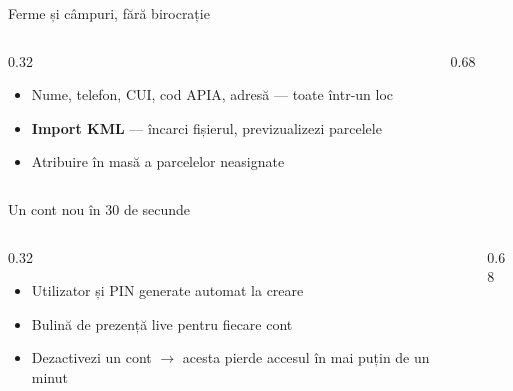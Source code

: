 \documentclass[aspectratio=169,10pt]{beamer}
\begin{document}
\begin{frame}{Ferme și câmpuri, fără birocrație}
  \begin{columns}[T]
    \begin{column}{0.32\linewidth}
      \vspace{0.3cm}
      \begin{itemize}
        \item Nume, telefon, CUI, cod APIA, adresă — toate într-un loc
        \item \textbf{Import KML} — încarci fișierul, previzualizezi parcelele
        \item Atribuire în masă a parcelelor neasignate
      \end{itemize}
    \end{column}
    \begin{column}{0.68\linewidth}
    \end{column}
  \end{columns}
\end{frame}

\begin{frame}{Un cont nou în 30 de secunde}
  \begin{columns}[T]
    \begin{column}{0.32\linewidth}
      \vspace{0.3cm}
      \begin{itemize}
        \item Utilizator și PIN generate automat la creare
        \item Bulină de prezență live pentru fiecare cont
        \item Dezactivezi un cont $\rightarrow$ acesta pierde accesul în mai puțin de un minut
      \end{itemize}
    \end{column}
    \begin{column}{0.68\linewidth}
    \end{column}
  \end{columns}
\end{frame}
\end{document}
